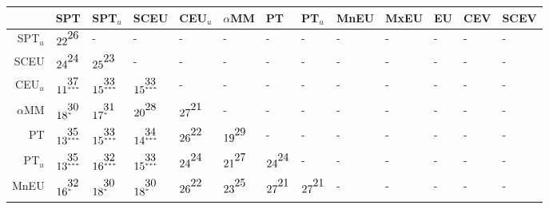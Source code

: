 \begin{table}[!htb]
\centering
\begin{tabular}{rllllllllllll}
  \hline
 & SPT & SPT$_{u}$ & SCEU & CEU$_{u}$ & $\alpha$MM & PT & PT$_{u}$ & MnEU & MxEU & EU & CEV & SCEV \\ 
  \hline
SPT$_{u}$ & $22^{\stackrel{\textstyle26\hfill}{\scriptscriptstyle\hfill}}$ & - & - & - & - & - & - & - & - & - & - & - \\ 
  SCEU & $24^{\stackrel{\textstyle24\hfill}{\scriptscriptstyle\hfill}}$ & $25^{\stackrel{\textstyle23\hfill}{\scriptscriptstyle\hfill}}$ & - & - & - & - & - & - & - & - & - & - \\ 
  CEU$_{u}$ & $11^{\stackrel{\textstyle37\hfill}{\scriptscriptstyle***\hfill}}$ & $15^{\stackrel{\textstyle33\hfill}{\scriptscriptstyle***\hfill}}$ & $15^{\stackrel{\textstyle33\hfill}{\scriptscriptstyle***\hfill}}$ & - & - & - & - & - & - & - & - & - \\ 
  $\alpha$MM & $18^{\stackrel{\textstyle30\hfill}{\scriptscriptstyle*\hfill}}$ & $17^{\stackrel{\textstyle31\hfill}{\scriptscriptstyle*\hfill}}$ & $20^{\stackrel{\textstyle28\hfill}{\scriptscriptstyle\hfill}}$ & $27^{\stackrel{\textstyle21\hfill}{\scriptscriptstyle\hfill}}$ & - & - & - & - & - & - & - & - \\ 
  PT & $13^{\stackrel{\textstyle35\hfill}{\scriptscriptstyle***\hfill}}$ & $15^{\stackrel{\textstyle33\hfill}{\scriptscriptstyle***\hfill}}$ & $14^{\stackrel{\textstyle34\hfill}{\scriptscriptstyle***\hfill}}$ & $26^{\stackrel{\textstyle22\hfill}{\scriptscriptstyle\hfill}}$ & $19^{\stackrel{\textstyle29\hfill}{\scriptscriptstyle\hfill}}$ & - & - & - & - & - & - & - \\ 
  PT$_{u}$ & $13^{\stackrel{\textstyle35\hfill}{\scriptscriptstyle***\hfill}}$ & $16^{\stackrel{\textstyle32\hfill}{\scriptscriptstyle***\hfill}}$ & $15^{\stackrel{\textstyle33\hfill}{\scriptscriptstyle***\hfill}}$ & $24^{\stackrel{\textstyle24\hfill}{\scriptscriptstyle\hfill}}$ & $21^{\stackrel{\textstyle27\hfill}{\scriptscriptstyle\hfill}}$ & $24^{\stackrel{\textstyle24\hfill}{\scriptscriptstyle\hfill}}$ & - & - & - & - & - & - \\ 
  MnEU & $16^{\stackrel{\textstyle32\hfill}{\scriptscriptstyle*\hfill}}$ & $18^{\stackrel{\textstyle30\hfill}{\scriptscriptstyle*\hfill}}$ & $18^{\stackrel{\textstyle30\hfill}{\scriptscriptstyle*\hfill}}$ & $26^{\stackrel{\textstyle22\hfill}{\scriptscriptstyle\hfill}}$ & $23^{\stackrel{\textstyle25\hfill}{\scriptscriptstyle\hfill}}$ & $27^{\stackrel{\textstyle21\hfill}{\scriptscriptstyle\hfill}}$ & $27^{\stackrel{\textstyle21\hfill}{\scriptscriptstyle\hfill}}$ & - & - & - & - & - \\ 

\end{tabular}
\end{table}

